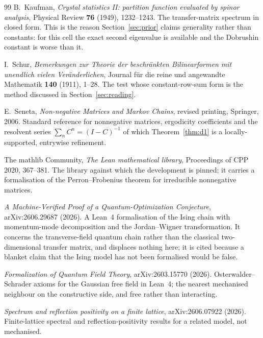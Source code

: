 \documentclass[11pt]{article}
\theoremstyle{definition}
\begin{document}
\begin{thebibliography}{99}
B.~Kaufman,
\emph{Crystal statistics II: partition function evaluated by spinor analysis},
Physical Review \textbf{76} (1949), 1232--1243.
The transfer-matrix spectrum in closed form.  This is the reason
Section~\ref{sec:prior} claims generality rather than constants: for this cell
the exact second eigenvalue is available and the Dobrushin constant is worse
than it.

I.~Schur,
\emph{Bemerkungen zur Theorie der beschr\"ankten Bilinearformen mit unendlich
vielen Ver\"anderlichen},
Journal f\"ur die reine und angewandte Mathematik \textbf{140} (1911), 1--28.
The test whose constant-row-sum form is the method discussed in
Section~\ref{sec:reading}.

E.~Seneta,
\emph{Non-negative Matrices and Markov Chains}, revised printing,
Springer, 2006.
Standard reference for nonnegative matrices, ergodicity coefficients and the
resolvent series $\sum_n C^{n}=(I-C)^{-1}$ of which
Theorem~\ref{thm:d1} is a locally-supported, entrywise refinement.

The mathlib Community,
\emph{The Lean mathematical library},
Proceedings of CPP 2020, 367--381.
The library against which the development is pinned; it carries a formalisation
of the Perron--Frobenius theorem for irreducible nonnegative matrices.

\emph{A Machine-Verified Proof of a Quantum-Optimization Conjecture},
arXiv:2606.29687 (2026).
A Lean~4 formalisation of the Ising chain with momentum-mode decomposition and
the Jordan--Wigner transformation.  It concerns the transverse-field quantum
chain rather than the classical two-dimensional transfer matrix, and displaces
nothing here; it is cited because a blanket claim that the Ising model has not
been formalised would be false.

\emph{Formalization of Quantum Field Theory},
arXiv:2603.15770 (2026).
Osterwalder--Schrader axioms for the Gaussian free field in Lean~4; the nearest
mechanised neighbour on the constructive side, and free rather than
interacting.

\emph{Spectrum and reflection positivity on a finite lattice},
arXiv:2606.07922 (2026).
Finite-lattice spectral and reflection-positivity results for a related model,
not mechanised.

\end{thebibliography}
\end{document}
